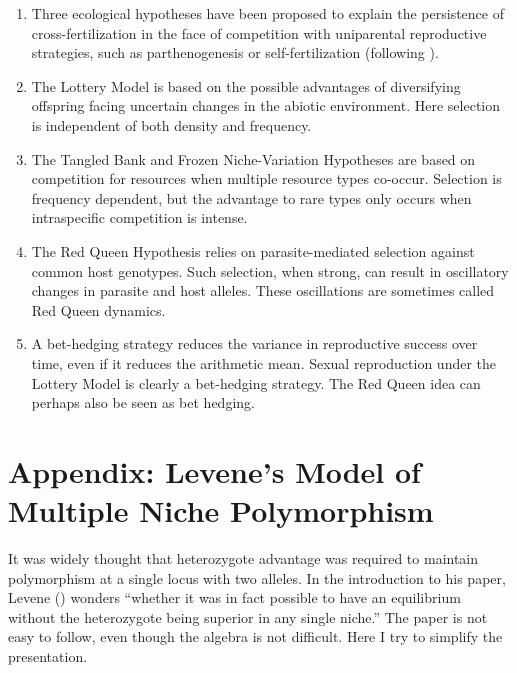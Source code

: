 \documentclass[
  letterpaper,
]{book}
\begin{document}
\begin{enumerate}
\def\labelenumi{\arabic{enumi}.}
\item
  Three ecological hypotheses have been proposed to explain the
  persistence of cross-fertilization in the face of competition with
  uniparental reproductive strategies, such as parthenogenesis or
  self-fertilization (following ).
\item
  The Lottery Model is based on the possible advantages of diversifying
  offspring facing uncertain changes in the abiotic environment. Here
  selection is independent of both density and frequency.
\item
  The Tangled Bank and Frozen Niche-Variation Hypotheses are based on
  competition for resources when multiple resource types co-occur.
  Selection is frequency dependent, but the advantage to rare types only
  occurs when intraspecific competition is intense.
\item
  The Red Queen Hypothesis relies on parasite-mediated selection against
  common host genotypes. Such selection, when strong, can result in
  oscillatory changes in parasite and host alleles. These oscillations
  are sometimes called Red Queen dynamics.
\item
  A bet-hedging strategy reduces the variance in reproductive success
  over time, even if it reduces the arithmetic mean. Sexual reproduction
  under the Lottery Model is clearly a bet-hedging strategy. The Red
  Queen idea can perhaps also be seen as bet hedging.
\end{enumerate}

\section{Appendix: Levene's Model of Multiple Niche
Polymorphism}\label{sec-app-2}

It was widely thought that heterozygote advantage was required to
maintain polymorphism at a single locus with two alleles. In the
introduction to his paper, Levene ()
wonders ``whether it was in fact possible to have an equilibrium without
the heterozygote being superior in any single niche.'' The paper is not
easy to follow, even though the algebra is not difficult. Here I try to
simplify the presentation.
\end{document}
